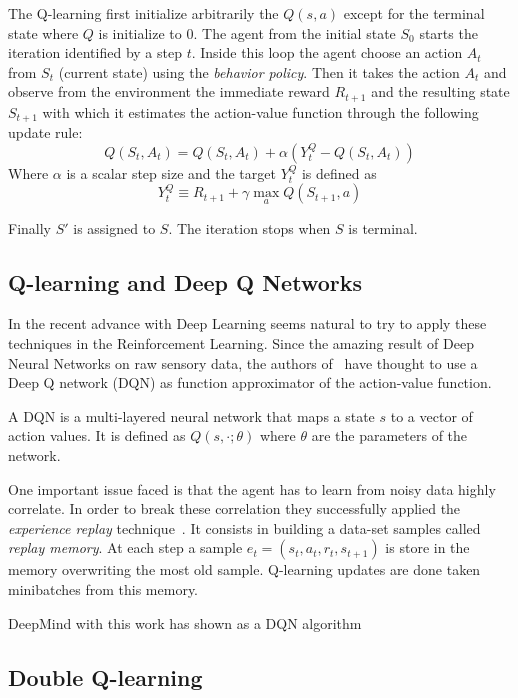 The Q-learning first initialize arbitrarily the $Q(s,a)$ except for the terminal state where $Q$ is initialize to 0.
The agent from the initial state $S_0$ starts the iteration identified by a step $t$. Inside this loop the agent choose an action $A_t$ from $S_t$ (current state) using the \textit{behavior policy}. Then it takes the action $A_t$ and observe from the environment the immediate reward $R_{t+1}$ and the resulting state $S_{t+1}$ with which it estimates the action-value function through the following update rule:
\begin{equation}
	Q(S_t, A_t) = Q(S_t, A_t) + \alpha (Y^Q_t - Q(S_t, A_t))
\end{equation}
Where $\alpha$ is a scalar step size and the target $Y^Q_t$ is defined as
\begin{equation}
	Y^Q_t \equiv R_{t+1} + \gamma \max_{a} Q(S_{t+1}, a)
\end{equation}

Finally $S'$ is assigned to $S$. The iteration stops when $S$ is terminal.

\subsection{Q-learning and Deep Q Networks}

In the recent advance with Deep Learning seems natural to try to apply these techniques in the Reinforcement Learning. Since the amazing result of Deep Neural Networks on raw sensory data, the authors of~\cite{DBLP:journals/corr/MnihKSGAWR13} have thought to use a Deep Q network (DQN) as function approximator of the action-value function.

A DQN is a multi-layered neural network that maps a state $s$ to a vector of action values. It is defined as $Q(s, \cdotp; \theta)$ where $\theta$ are the parameters of the network. 

One important issue faced is that the agent has to learn from noisy data highly correlate. In order to break these correlation they successfully applied the \textit{experience replay} technique~\cite{Lin:1992:RLR:168871}. It consists in building a data-set samples called \textit{replay memory}. At each step a sample $e_t = (s_t, a_t, r_t, s_{t+1})$ is store in the memory overwriting the most old sample. Q-learning updates are done taken minibatches from this memory.

DeepMind with this work has shown as a DQN algorithm 


\subsection{Double Q-learning}

